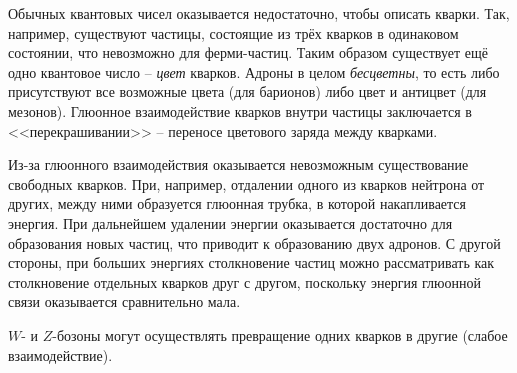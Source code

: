 \noindent
Обычных квантовых чисел оказывается недостаточно, чтобы описать кварки. Так, например, существуют частицы, состоящие из трёх кварков в одинаковом состоянии, что невозможно для ферми-частиц. Таким образом существует ещё одно квантовое число -- \textit{цвет} кварков. Адроны в целом \textit{бесцветны}, то есть либо присутствуют все возможные цвета (для барионов) либо цвет и антицвет (для мезонов). Глюонное взаимодействие кварков внутри частицы заключается в <<перекрашивании>> -- переносе цветового заряда между кварками.

Из-за глюонного взаимодействия оказывается невозможным существование свободных кварков. При, например, отдалении одного из кварков нейтрона от других, между ними образуется глюонная трубка, в которой накапливается энергия. При дальнейшем удалении энергии оказывается достаточно для образования новых частиц, что приводит к образованию двух адронов. С другой стороны, при больших энергиях столкновение частиц можно рассматривать как столкновение отдельных кварков друг с другом, поскольку энергия глюонной связи оказывается сравнительно мала.

$W$- и $Z$-бозоны могут осуществлять превращение одних кварков в другие (слабое взаимодействие).